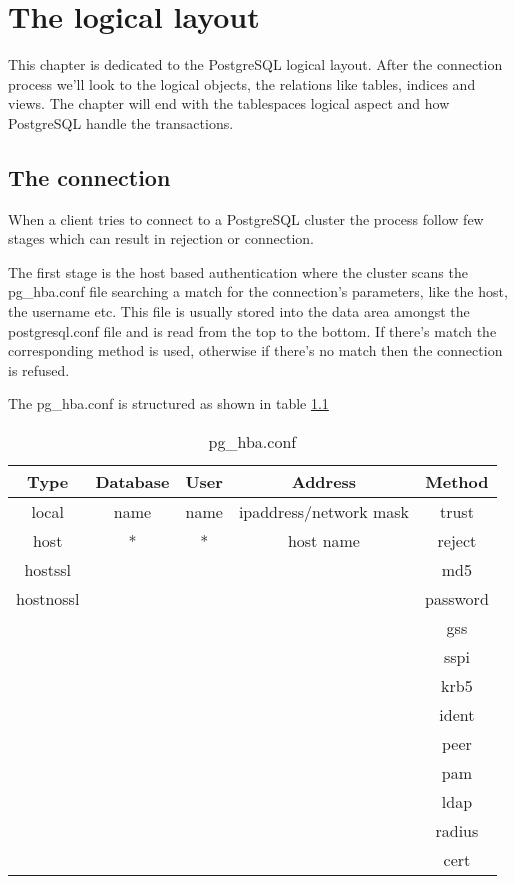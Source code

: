 \chapter{The logical layout}
\label{cha:LOGICLAY}
This chapter is dedicated to the PostgreSQL logical layout.
After the connection process we'll look to the logical objects, the 
relations like tables, indices and views. The chapter will end with the 
tablespaces logical aspect and how PostgreSQL handle the transactions.

\section{The connection}
When a client tries to connect to a PostgreSQL cluster the process 
follow few stages which can result in rejection or connection.

The first stage is the host based authentication where the cluster 
scans the pg\_hba.conf file searching a  match for the connection's 
parameters, like the host, the username etc. This file is usually stored into 
the data area amongst the postgresql.conf file and is read from the top to the 
bottom. If there's match the corresponding method is used, otherwise if 
there's no match then the connection is refused.

The pg\_hba.conf is structured as shown in table \ref{tab:PGHBA}

\begin{table}[H]
  \begin{tabular}{ccccc}
    Type & Database & User & Address & Method \\ 
    \hline
    local & name & name & ipaddress/network mask & trust\\
    host & * & * & host name & reject\\
    hostssl & &  &  & md5\\
    hostnossl & &  &  & password \\
    & & &  & gss \\
    & & &  & sspi \\
    & & &  & krb5 \\
    & & &  & ident \\
    & & &  & peer \\
    & & &  & pam \\
    & & &  & ldap \\
    & & &  & radius \\
    & & &  & cert \\
  \end{tabular}
  \caption{\label{tab:PGHBA}pg\_hba.conf}
\end{table}


